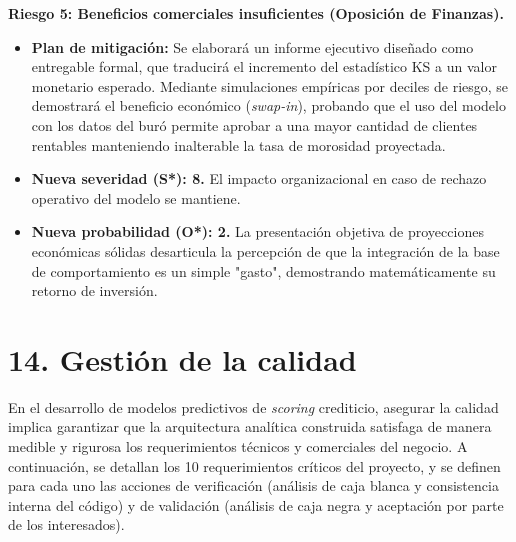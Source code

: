 \documentclass[
11pt, %
]{charter}
\begin{document}
\textbf{Riesgo 5: Beneficios comerciales insuficientes (Oposición de Finanzas).}
\begin{itemize}
    \item \textbf{Plan de mitigación:} Se elaborará un informe ejecutivo diseñado como entregable formal, que traducirá el incremento del estadístico KS a un valor monetario esperado. Mediante simulaciones empíricas por deciles de riesgo, se demostrará el beneficio económico (\textit{swap-in}), probando que el uso del modelo con los datos del buró permite aprobar a una mayor cantidad de clientes rentables manteniendo inalterable la tasa de morosidad proyectada.
    \item \textbf{Nueva severidad (S*): 8.} El impacto organizacional en caso de rechazo operativo del modelo se mantiene.
    \item \textbf{Nueva probabilidad (O*): 2.} La presentación objetiva de proyecciones económicas sólidas desarticula la percepción de que la integración de la base de comportamiento es un simple "gasto", demostrando matemáticamente su retorno de inversión.
\end{itemize}


\section{14. Gestión de la calidad}
\label{sec:calidad}

En el desarrollo de modelos predictivos de \textit{scoring} crediticio, asegurar la calidad implica garantizar que la arquitectura analítica construida satisfaga de manera medible y rigurosa los requerimientos técnicos y comerciales del negocio. A continuación, se detallan los 10 requerimientos críticos del proyecto, y se definen para cada uno las acciones de verificación (análisis de caja blanca y consistencia interna del código) y de validación (análisis de caja negra y aceptación por parte de los interesados).
\end{document}
